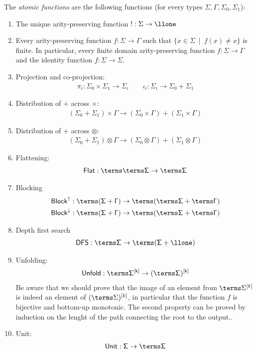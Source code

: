 \begin{definition}\label{def:atomic-functions} The \emph{atomic functions} are the following functions (for every types $\Sigma,\Gamma,\Sigma_0,\Sigma_1$): 
\begin{enumerate}
    \item The unique arity-preserving function $! : \Sigma \to \llone$
    \item Every arity-preserving function $f : \Sigma \to \Gamma$ such that    $\{x \in \Sigma \ \mid \ f(x)\neq x\}$ is finite. In particular, every finite domain arity-preserving function $f : \Sigma \to \Gamma$ and the identity function $f : \Sigma \to \Sigma$.
    \item Projection and co-projection:
    \begin{align*}
        \pi_i : \Sigma_0 \times \Sigma_1 \to \Sigma_i \qquad \iota_i : \Sigma_i \to \Sigma_0 + \Sigma_1
    \end{align*}
    \item Distribution of $+$ across $\times$:
\begin{align*}
    (\Sigma_0 + \Sigma_1 ) \times \Gamma \to (\Sigma_0 \times \Gamma) + (\Sigma_1 \times \Gamma)
\end{align*}
\item Distribution of $+$ across $\otimes$:
\begin{align*}
    (\Sigma_0 + \Sigma_1 ) \otimes \Gamma \to (\Sigma_0 \otimes \Gamma) + (\Sigma_1 \otimes \Gamma)
\end{align*}
\item Flattening:
\begin{align*}
    \sf{Flat}: \terms \terms \Sigma \to \terms \Sigma
\end{align*}
\item Blocking
    \begin{align*}
        \sf{Block}^{\uparrow}:\terms (\Sigma + \Gamma) \to \terms (\terms \Sigma + \terms \Gamma)\\
        \sf{Block}^{\downarrow}:\terms (\Sigma + \Gamma) \to \terms (\terms \Sigma + \terms \Gamma)
    \end{align*}
    \item Depth first search
    \begin{align*}
        \sf{DFS}:\terms \Sigma \to \terms (\Sigma+\llone)
    \end{align*}
    \item Unfolding: 
\begin{align*}
    \sf{Unfold}:\terms \Sigma^{[k]} \to (\terms \Sigma)^{[k]}
\end{align*}
Be aware that we should prove that the image of an element from $\terms \Sigma^{[k]}$ is indeed an element of $(\terms \Sigma)^{[k]}$, in particular that the function $f$ is bijective and bottom-up monotonic. The second property can be proved by induction on the lenght of the path connecting the root to the output..
    \item Unit:
\begin{align*}
    \sf{Unit}:\Sigma  \to \terms \Sigma
\end{align*}


\end{enumerate}
\end{definition}
